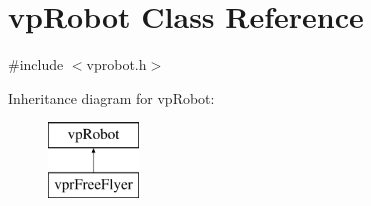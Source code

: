 \hypertarget{classvpRobot}{}\section{vp\+Robot Class Reference}
\label{classvpRobot}


{\ttfamily \#include $<$vprobot.\+h$>$}

Inheritance diagram for vp\+Robot\+:\begin{figure}[H]
\begin{center}
\leavevmode
\includegraphics[height=2.000000cm]{classvpRobot}
\end{center}
\end{figure}
